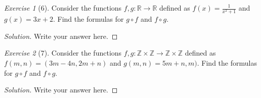 \documentclass[12pt]{amsart}
\theoremstyle{remark}
\newtheorem*{exercise}{Exercise}%
\def\RR{\ensuremath{\mathbb R}}
\def\ZZ{\ensuremath{\mathbb Z}}
\theoremstyle{mycomment}
\begin{document}
\begin{exercise}[6] Consider the functions $f,g:\RR\to\RR$ defined as $f(x)=\frac{1}{x^{2}+1}$ and $g(x)=3x+2$. Find the formulas for $g\circ f$ and $f\circ g$.
\begin{proof}[Solution]
Write your answer here.
\end{proof}
\end{exercise}

\begin{exercise}[7] Consider the functions $f,g:\ZZ\times \ZZ\to \ZZ\times \ZZ$ defined as $f(m,n)=(3m-4n,2m+n)$ and $g(m,n)=5m+n
,m)$. Find the formulas for $g\circ f$ and $f\circ g$.
\begin{proof}[Solution]
Write your answer here.
\end{proof}
\end{exercise}
\end{document}
